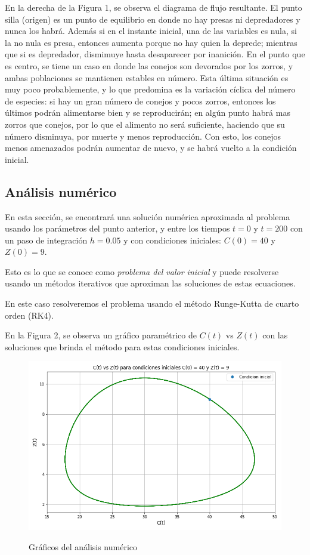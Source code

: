 \documentclass[12pt,letterpaper]{article}
\begin{document}
En la derecha de la Figura 1, se observa el diagrama de flujo resultante. El punto silla (origen) es un punto de equilibrio en donde no hay presas ni depredadores y nunca los habrá. Además si en el instante inicial, una de las variables es nula, si la no nula es presa, entonces aumenta porque no hay quien la deprede; mientras que si es depredador, dismimuye hasta desaparecer por inanición. En el punto que es centro, se tiene un caso en donde las conejos son devorados por los zorros, y ambas poblaciones se mantienen estables en número. Esta última situación es muy poco probablemente, y lo que predomina es la variación cíclica del número de especies: si hay un gran número de conejos y pocos zorros, entonces los últimos podrán alimentarse bien y se reproducirán; en algún punto habrá mas zorros que conejos, por lo que el alimento no será suficiente, haciendo que su número disminuya, por muerte y menos reproducción. Con esto, los conejos menos amenazados podrán aumentar de nuevo, y se habrá vuelto a la condición inicial. 

\subsection{Análisis numérico}

En esta sección, se encontrará una solución numérica aproximada al problema usando los parámetros del punto anterior, y entre los tiempos  $t=0$  y  $t=200$ con un paso de integración  $h=0.05$ y  con condiciones iniciales: $C(0)=40$ y $Z(0)=9$.
 
Esto es lo que se conoce como \textit{problema del valor inicial} y puede resolverse usando un métodos iterativos que aproximan las soluciones de estas ecuaciones.

En este caso resolveremos el problema usando el método Runge-Kutta de cuarto orden (RK4).

En la Figura 2, se observa un gráfico paramétrico de $C(t)$ vs $Z(t)$ con las soluciones que brinda el método para estas condiciones iniciales.

\begin{figure}[h!]
\begin{floatrow}
\centering
\caption{Gráficos del análisis numérico}
\includegraphics[width=12cm]{./images/rabbits_and_foxes_3.png}
\label{fig:esquema}
\end{floatrow}
\end{figure}
\end{document}
